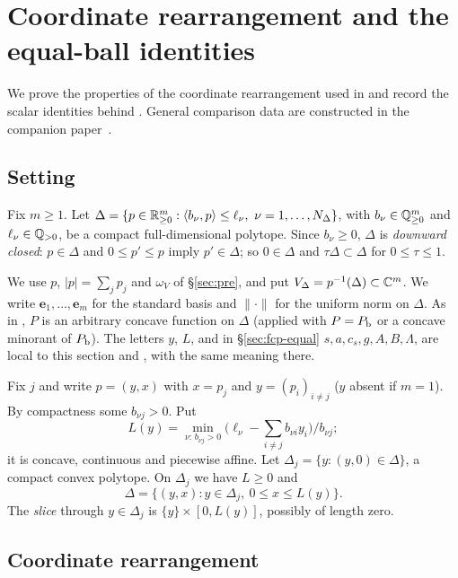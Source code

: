 \section{Coordinate rearrangement and the equal-ball identities}\label{sec:fcp}

We prove the properties of the coordinate rearrangement used in  and record the scalar identities behind
. General comparison data are constructed in the companion paper~\cite{SongHD}.

\subsection{Setting}\label{sec:fcp-setting}

Fix $m\ge1$. Let $\Delta=\{p\in\mathbb{R}^m_{\ge0}:\langle b_\nu,p\rangle\le\ell_\nu,\ \nu=1,\dots,N_\Delta\}$, with $b_\nu\in\mathbb{Q}^m_{\ge0}$ and $\ell_\nu\in\mathbb{Q}_{>0}$, be a compact full-dimensional polytope. Since $b_\nu\ge0$, $\Delta$ is \emph{downward closed}: $p\in\Delta$ and $0\le p'\le p$ imply $p'\in\Delta$; so $0\in\Delta$ and $\tau\Delta\subset\Delta$ for $0\le\tau\le1$.

We use $p$, $|p|=\sum_jp_j$ and $\omega_V$ of \S\ref{sec:pre}, and put $V_\Delta=p^{-1}(\Delta)\subset\mathbb{C}^m$. We write $\mathbf e_1,\dots,\mathbf e_m$ for the standard basis and $\|\cdot\|$ for the uniform norm on $\Delta$. As in , $P$ is an arbitrary concave function on $\Delta$ (applied with $P=P_{\mathrm b}$ or a concave minorant of $P_{\mathrm b}$). The letters $y$, $L$, and in \S\ref{sec:fcp-equal} $s,a,c_s,g,A,B,\Lambda$, are local to this section and , with the same meaning there.

Fix $j$ and write $p=(y,x)$ with $x=p_j$ and $y=(p_i)_{i\ne j}$ ($y$ absent if $m=1$). By compactness some $b_{\nu j}>0$. Put
$$L(y)=\min_{\nu:\,b_{\nu j}>0}\bigl(\ell_\nu-\textstyle\sum_{i\ne j}b_{\nu i}y_i\bigr)/b_{\nu j};$$
it is concave, continuous and piecewise affine. Let $\Delta_j=\{y:(y,0)\in\Delta\}$, a compact convex polytope. On $\Delta_j$ we have $L\ge0$ and
\begin{equation}\label{eq:fcp-slices}
 \Delta=\{(y,x):y\in\Delta_j,\ 0\le x\le L(y)\}.
\end{equation}
The \emph{slice} through $y\in\Delta_j$ is $\{y\}\times[0,L(y)]$, possibly of length zero.

\subsection{Coordinate rearrangement}\label{sec:fcp-rearrangement}


